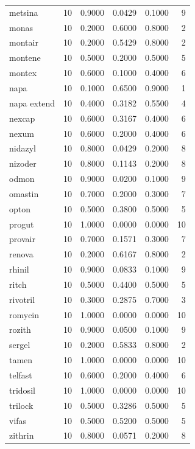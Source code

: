 \begin{longtable}{p{3.0cm}rrrrr}
metsina & 10 & 0.9000 & 0.0429 & 0.1000 & 9 \\
monas & 10 & 0.2000 & 0.6000 & 0.8000 & 2 \\
montair & 10 & 0.2000 & 0.5429 & 0.8000 & 2 \\
montene & 10 & 0.5000 & 0.2000 & 0.5000 & 5 \\
montex & 10 & 0.6000 & 0.1000 & 0.4000 & 6 \\
napa & 10 & 0.1000 & 0.6500 & 0.9000 & 1 \\
napa extend & 10 & 0.4000 & 0.3182 & 0.5500 & 4 \\
nexcap & 10 & 0.6000 & 0.3167 & 0.4000 & 6 \\
nexum & 10 & 0.6000 & 0.2000 & 0.4000 & 6 \\
nidazyl & 10 & 0.8000 & 0.0429 & 0.2000 & 8 \\
nizoder & 10 & 0.8000 & 0.1143 & 0.2000 & 8 \\
odmon & 10 & 0.9000 & 0.0200 & 0.1000 & 9 \\
omastin & 10 & 0.7000 & 0.2000 & 0.3000 & 7 \\
opton & 10 & 0.5000 & 0.3800 & 0.5000 & 5 \\
progut & 10 & 1.0000 & 0.0000 & 0.0000 & 10 \\
provair & 10 & 0.7000 & 0.1571 & 0.3000 & 7 \\
renova & 10 & 0.2000 & 0.6167 & 0.8000 & 2 \\
rhinil & 10 & 0.9000 & 0.0833 & 0.1000 & 9 \\
ritch & 10 & 0.5000 & 0.4400 & 0.5000 & 5 \\
rivotril & 10 & 0.3000 & 0.2875 & 0.7000 & 3 \\
romycin & 10 & 1.0000 & 0.0000 & 0.0000 & 10 \\
rozith & 10 & 0.9000 & 0.0500 & 0.1000 & 9 \\
sergel & 10 & 0.2000 & 0.5833 & 0.8000 & 2 \\
tamen & 10 & 1.0000 & 0.0000 & 0.0000 & 10 \\
telfast & 10 & 0.6000 & 0.2000 & 0.4000 & 6 \\
tridosil & 10 & 1.0000 & 0.0000 & 0.0000 & 10 \\
trilock & 10 & 0.5000 & 0.3286 & 0.5000 & 5 \\
vifas & 10 & 0.5000 & 0.5200 & 0.5000 & 5 \\
zithrin & 10 & 0.8000 & 0.0571 & 0.2000 & 8 \\
\end{longtable}
\endgroup
